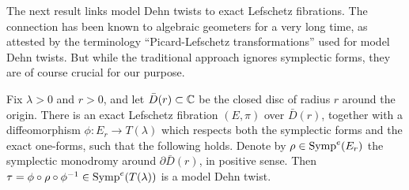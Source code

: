 \documentclass[10pt,letterpaper]{article}
\begin{document}
The next result links model Dehn twists to exact Lefschetz fibrations. The
connection has been known to algebraic geometers for a very long time, as
attested by the terminology ``Picard-Lefschetz transformations'' used for model
Dehn twists. But while the traditional approach ignores symplectic forms, they
are of course crucial for our purpose.

\begin{lemma} \label{th:model-fibrations}
Fix $\lambda>0$ and $r>0$, and let $\bar{D}(r) \subset \mathbb{C}$ be the closed disc
of radius $r$ around the origin. There is an exact Lefschetz fibration
$(E,\pi)$ over $\bar{D}(r)$, together with a diffeomorphism $\phi : E_r
\rightarrow T(\lambda)$ which respects both the symplectic forms and the exact
one-forms, such that the following holds. Denote by $\rho \in \mathrm{Symp}^e(E_r)$ the
symplectic monodromy around $\partial \bar{D}(r)$, in positive sense. Then
$\tau = \phi \circ \rho \circ \phi^{-1} \in \mathrm{Symp}^e(T(\lambda))$ is a model Dehn
twist.
\end{lemma}
\end{document}
